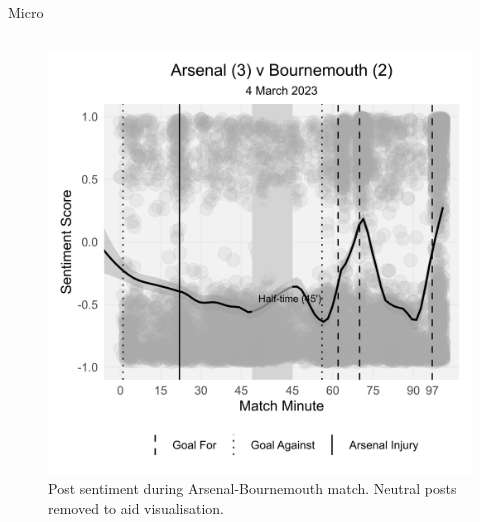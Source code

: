 \documentclass[10pt]{beamer}
\begin{document}
\begin{frame}{Micro}
\begin{columns}
\begin{column}{0.5\textwidth}
\begin{figure}
    \includegraphics[width=\columnwidth]{sentiment_specific_game_small_600dpi.jpg}
    \caption{Post sentiment during Arsenal-Bournemouth match. Neutral posts removed to aid visualisation.}
    \label{fig:arsenal_bournmouth}
\end{figure}
\end{column}
\end{columns}
\end{frame}
\end{document}
